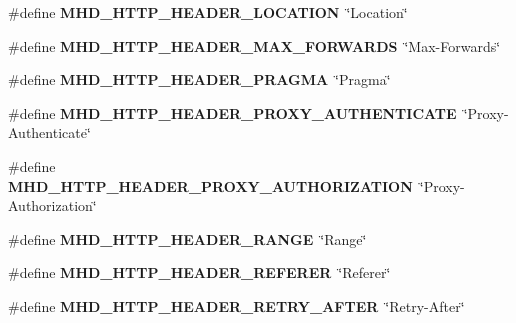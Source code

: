 \begin{DoxyCompactItemize}
\item 
\hypertarget{group__headers_gaaa2fc2e754e360d3d36df1c43737ee5d}{\#define {\bfseries \-M\-H\-D\-\_\-\-H\-T\-T\-P\-\_\-\-H\-E\-A\-D\-E\-R\-\_\-\-L\-O\-C\-A\-T\-I\-O\-N}~\char`\"{}\-Location\char`\"{}}\label{group__headers_gaaa2fc2e754e360d3d36df1c43737ee5d}

\item 
\hypertarget{group__headers_gaf0f030f05a160bc66417fb7081558d88}{\#define {\bfseries \-M\-H\-D\-\_\-\-H\-T\-T\-P\-\_\-\-H\-E\-A\-D\-E\-R\-\_\-\-M\-A\-X\-\_\-\-F\-O\-R\-W\-A\-R\-D\-S}~\char`\"{}\-Max-\/\-Forwards\char`\"{}}\label{group__headers_gaf0f030f05a160bc66417fb7081558d88}

\item 
\hypertarget{group__headers_ga51acbf05713abf81865a998a938efa4b}{\#define {\bfseries \-M\-H\-D\-\_\-\-H\-T\-T\-P\-\_\-\-H\-E\-A\-D\-E\-R\-\_\-\-P\-R\-A\-G\-M\-A}~\char`\"{}\-Pragma\char`\"{}}\label{group__headers_ga51acbf05713abf81865a998a938efa4b}

\item 
\hypertarget{group__headers_ga672b1e0a5377f90661ae987c69d0feb7}{\#define {\bfseries \-M\-H\-D\-\_\-\-H\-T\-T\-P\-\_\-\-H\-E\-A\-D\-E\-R\-\_\-\-P\-R\-O\-X\-Y\-\_\-\-A\-U\-T\-H\-E\-N\-T\-I\-C\-A\-T\-E}~\char`\"{}\-Proxy-\/\-Authenticate\char`\"{}}\label{group__headers_ga672b1e0a5377f90661ae987c69d0feb7}

\item 
\hypertarget{group__headers_gac9927bdfee0a9d41bede5dab27cf754d}{\#define {\bfseries \-M\-H\-D\-\_\-\-H\-T\-T\-P\-\_\-\-H\-E\-A\-D\-E\-R\-\_\-\-P\-R\-O\-X\-Y\-\_\-\-A\-U\-T\-H\-O\-R\-I\-Z\-A\-T\-I\-O\-N}~\char`\"{}\-Proxy-\/\-Authorization\char`\"{}}\label{group__headers_gac9927bdfee0a9d41bede5dab27cf754d}

\item 
\hypertarget{group__headers_gab14df238a4e198c912cd8404845b3bb2}{\#define {\bfseries \-M\-H\-D\-\_\-\-H\-T\-T\-P\-\_\-\-H\-E\-A\-D\-E\-R\-\_\-\-R\-A\-N\-G\-E}~\char`\"{}\-Range\char`\"{}}\label{group__headers_gab14df238a4e198c912cd8404845b3bb2}

\item 
\hypertarget{group__headers_ga619497a533b6f9a735a0724e025aa4c1}{\#define {\bfseries \-M\-H\-D\-\_\-\-H\-T\-T\-P\-\_\-\-H\-E\-A\-D\-E\-R\-\_\-\-R\-E\-F\-E\-R\-E\-R}~\char`\"{}\-Referer\char`\"{}}\label{group__headers_ga619497a533b6f9a735a0724e025aa4c1}

\item 
\hypertarget{group__headers_ga540be5c19f363693f148c4c5ee8e5725}{\#define {\bfseries \-M\-H\-D\-\_\-\-H\-T\-T\-P\-\_\-\-H\-E\-A\-D\-E\-R\-\_\-\-R\-E\-T\-R\-Y\-\_\-\-A\-F\-T\-E\-R}~\char`\"{}\-Retry-\/\-After\char`\"{}}\label{group__headers_ga540be5c19f363693f148c4c5ee8e5725}


\end{DoxyCompactItemize}
